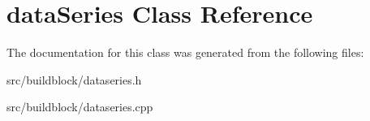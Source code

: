 \hypertarget{classdataSeries}{}\section{data\+Series Class Reference}
\label{classdataSeries}


The documentation for this class was generated from the following files\+:\begin{DoxyCompactItemize}
\item 
src/buildblock/dataseries.\+h\item 
src/buildblock/dataseries.\+cpp\end{DoxyCompactItemize}
